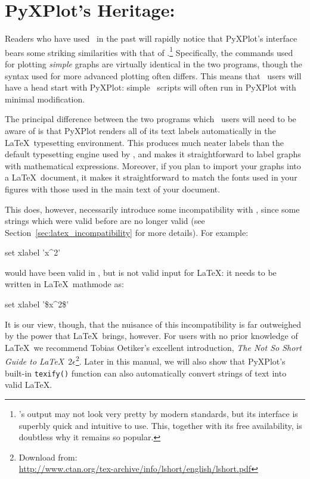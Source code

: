 \section{PyXPlot's Heritage: \gnuplot}

Readers who have used \gnuplot\ in the past will rapidly notice that PyXPlot's
interface bears some striking similarities with that of
\gnuplot.\footnote{\gnuplot's output may not look very pretty by modern
standards, but its interface is superbly quick and intuitive to use. This,
together with its free availability, is doubtless why it remains so popular.}
Specifically, the commands used for plotting {\it simple} graphs are virtually
identical in the two programs, though the syntax used for more advanced
plotting often differs. This means that \gnuplot\ users will have a head start
with PyXPlot: simple \gnuplot\ scripts will often run in PyXPlot with minimal
modification.

The principal difference between the two programs which \gnuplot\ users will
need to be aware of is that PyXPlot renders all of its text labels
automatically in the \LaTeX\ typesetting environment. This produces much neater
labels than the default typesetting engine used by \gnuplot, and makes it
straightforward to label graphs with mathematical expressions. Moreover, if you
plan to import your graphs into a \LaTeX\ document, it makes it straightforward
to match the fonts used in your figures with those used in the main text of
your document.

This does, however, necessarily introduce some incompatibility with \gnuplot,
since some strings which were valid before are no longer valid (see
Section~\ref{sec:latex_incompatibility} for more details). For
example:

\begin{dontdo}
set xlabel 'x\^{}2'
\end{dontdo}

\noindent would have been valid in \gnuplot, but is not valid input for \LaTeX:
it needs to be written in \LaTeX\ mathmode as:

\begin{dodo}
set xlabel '\$x\^{}2\$'
\end{dodo}

\noindent It is our view, though, that the nuisance of this incompatibility is
far outweighed by the power that \LaTeX\ brings, however. For users with no
prior knowledge of \LaTeX\ we recommend Tobias Oetiker's
excellent introduction, {\it The Not So Short Guide to \LaTeX\
$2\epsilon$}\footnote{Download from:\\
\url{http://www.ctan.org/tex-archive/info/lshort/english/lshort.pdf}}. Later in
this manual, we will also show that PyXPlot's built-in  {\tt texify()} function
can also automatically convert strings of text into valid \LaTeX.

